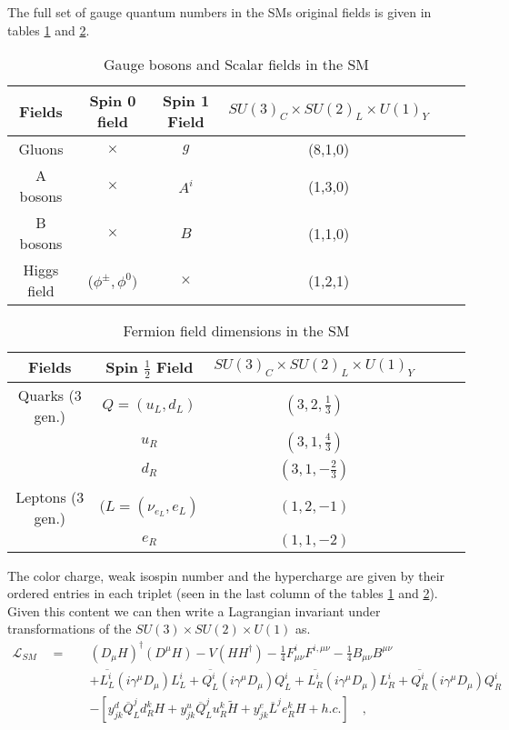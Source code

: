 The full set of gauge quantum numbers in the SMs original fields is given in tables \ref{table1} and \ref{table2}. 
%
\begin{table}[H]
\centering
\caption{Gauge bosons and Scalar fields in the SM}
\label{table1}
\begin{tabular}{@{}cccccc@{}}
  \hline	
 Fields & Spin 0 field & Spin 1 Field & $SU(3)_C \times SU(2)_L \times U(1)_Y$  \\
  \hline	
 Gluons  & $\times$  & $g$ & (8,1,0) \\	
A bosons & $\times$  & $A^i$ & (1,3,0)   \\
B bosons & $\times$  & $B$ & (1,1,0)   \\
Higgs field & ($\phi^\pm, \phi^0 )$  & $\times$ & (1,2,1) \\ \hline
\end{tabular}
\end{table}
\begin{table}[H]
\centering
\caption{Fermion field dimensions in the SM}
\label{table2}
\begin{tabular}{@{}cccccc@{}}
  \hline	
 Fields & Spin $\frac{1}{2}$ Field & $SU(3)_C \times SU(2)_L \times U(1)_Y$  \\
  \hline	
Quarks (3 gen.) & $Q=(u_L,d_L)$ & $(3,2,\frac{1}{3})$ \\	
$\quad$        & $u_R$ & $(3,1,\frac{4}{3})$   \\
$\quad$   & $d_R$ & $(3,1, -\frac{2}{3})$   \\
Leptons (3 gen.) & $(L=(\nu_{e_L}, e_L )$ & $(1,2,-1)$  \\
$\quad$   & $e_R$ & $(1,1,-2)   $ \\ \hline

\end{tabular}
\end{table}
%
The color charge, weak isospin number and the hypercharge are given by their ordered entries in each triplet (seen in the last column of the tables \ref{table1} and \ref{table2}). Given this content we can then write a Lagrangian invariant under transformations of the $SU(3) \times SU(2) \times U(1)$ as.
%
\begin{align}
\mathcal{L}_{SM} \quad = \quad & (D_\mu H)^\dagger (D^\mu H) - V (H H^\dagger) -  \frac{1}{4} F^i_{\mu \nu} F^{i , \mu \nu} - \frac{1}{4} B_{\mu \nu} B^{\mu \nu} \nonumber \\ 
& + \overline{L_L^i} (i \gamma^\mu D_\mu)  L_L^i +  \overline{Q^i_L} (i \gamma^\mu D_\mu)  Q^i_L +  \overline{L_R^i} (i \gamma^\mu D_\mu)  L_R^i +  \overline{Q^i_R} (i \gamma^\mu D_\mu)  Q^i_R \label{SMfullL}    \\  
 & - [y^d_{jk}\overline{Q}^j_{L} d^k_{R} H +  y_{jk}^u \overline{Q}^j_{L} u^k_{R} \tilde{H} + y^e_{jk} \overline{L}^j e^k_{R} H  + h.c. ] \nonumber \quad , 
\end{align}
